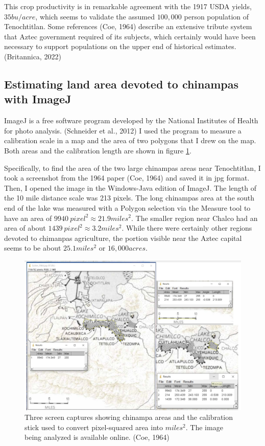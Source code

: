 \documentclass[man]{apa7}
\begin{document}
This crop productivity is in remarkable agreement with the 1917 USDA yields, $35bu/acre$, which seems to validate the assumed $100,000$ person population of Tenochtitlan.  Some references (Coe, 1964) describe an extensive tribute system that Aztec government required of its subjects, which certainly would have been necessary to support populations on the upper end of historical estimates. (Britannica, 2022)

\subsection{Estimating land area devoted to chinampas with ImageJ}
\label{appx_imageJ}

ImageJ is a free software program developed by the National Institutes of Health for photo analysis. (Schneider et al., 2012)  I used the program to measure a calibration scale in a map and the area of two polygons that I drew on the map.  Both areas and the calibration length are shown in figure \ref{imageJ}.

Specifically, to find the area of the two large chinampas areas near Tenochtitlan, I took a screenshot from the 1964 paper (Coe, 1964) and saved it in jpg format.  Then, I opened the image in the Windows-Java edition of ImageJ.  The length of the 10 mile distance scale was 213 pixels. The long chinampas area at the south end of the lake was measured with a Polygon selection via the Measure tool to have an area of $9940~pixel^2\approx21.9miles^2$.  The smaller region near Chalco had an area of about $1439~pixel^2\approx3.2miles^2$.  While there were certainly other regions devoted to chimanpas agriculture, the portion visible near the Aztec capital seems to be about $25.1miles^2$ or $16,000acres$.  

\begin{figure}[ht!]
\centering
\includegraphics[width=\columnwidth]{imageJ_analysis.jpg}
\caption{
Three screen captures showing chinampa areas and the calibration stick used to convert pixel-squared area into $miles^2$.  The image being analyzed is available online. (Coe, 1964)
}
\label{imageJ}
\end{figure}
\end{document}
